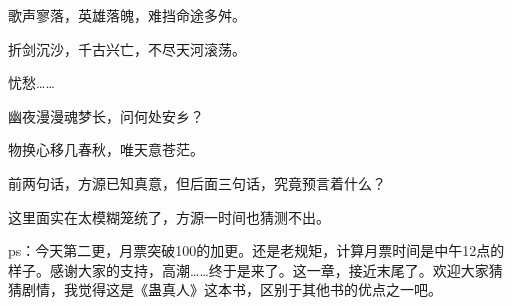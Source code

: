 \begin{this_body}
歌声寥落，英雄落魄，难挡命途多舛。

折剑沉沙，千古兴亡，不尽天河滚荡。

忧愁……

幽夜漫漫魂梦长，问何处安乡？

物换心移几春秋，唯天意苍茫。

前两句话，方源已知真意，但后面三句话，究竟预言着什么？

这里面实在太模糊笼统了，方源一时间也猜测不出。

ps：今天第二更，月票突破100的加更。还是老规矩，计算月票时间是中午12点的样子。感谢大家的支持，高潮……终于是来了。这一章，接近末尾了。欢迎大家猜猜剧情，我觉得这是《蛊真人》这本书，区别于其他书的优点之一吧。

\end{this_body}

